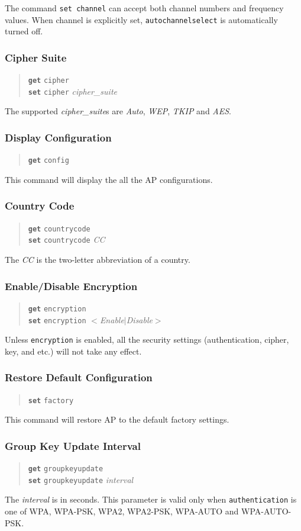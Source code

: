 \documentclass[10pt,fullpage]{article}
\newcommand{\mytt}[1]{{\texttt{#1}}}
\newcommand{\bv}{\begin{verse}}
\newcommand{\ev}{\end{verse}}
\newcommand{\clicmd}[1]{{\textbf{\texttt{#1}}}}
\newcommand{\cliparam}[1]{{\texttt{#1}}}
\newcommand{\clival}[1]{{\emph{#1}}}
\begin{document}
The command \mytt{set channel} can accept both channel numbers and frequency values.
When channel is explicitly set, \cliparam{autochannelselect} is automatically turned off.

\subsubsection{Cipher Suite}
\bv
\clicmd{get} \cliparam{cipher}\\
\clicmd{set} \cliparam{cipher} \clival{cipher\_suite}
\ev
The supported \clival{cipher\_suite}s are
\clival{Auto}, \clival{WEP}, \clival{TKIP} and \clival{AES}.

\subsubsection{Display Configuration}
\bv
\clicmd{get} \cliparam{config}
\ev
This command will display the all the AP configurations.

\subsubsection{Country Code}
\bv
\clicmd{get} \cliparam{countrycode}\\
\clicmd{set} \cliparam{countrycode} \clival{CC}
\ev
The \clival{CC} is the two-letter abbreviation of a country.

\subsubsection{Enable/Disable Encryption}
\bv
\clicmd{get} \cliparam{encryption}\\
\clicmd{set} \cliparam{encryption} $<$\clival{Enable}$|$\clival{Disable}$>$
\ev
Unless \cliparam{encryption} is enabled, all the security settings (authentication,
cipher, key, and etc.) will not take any effect.

\subsubsection{Restore Default Configuration}
\bv
\clicmd{set} \cliparam{factory}
\ev
This command will restore AP to the default factory settings.

\subsubsection{Group Key Update Interval}
\bv
\clicmd{get} \cliparam{groupkeyupdate}\\
\clicmd{set} \cliparam{groupkeyupdate} \clival{interval}
\ev
The \clival{interval} is in seconds. This parameter is valid only when 
\mytt{authentication} is one of WPA, WPA-PSK, WPA2, WPA2-PSK, WPA-AUTO and WPA-AUTO-PSK.
\end{document}
